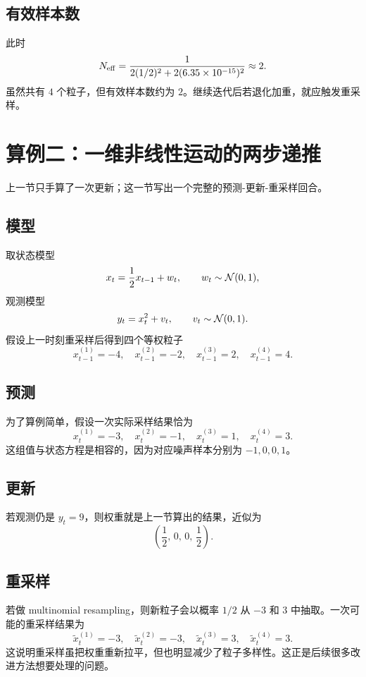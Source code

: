 \documentclass[12pt,a4paper]{ctexart}
\begin{document}
\subsection{有效样本数}

此时
\[
N_{\mathrm{eff}}
= \frac{1}{2(1/2)^2 + 2(6.35\times 10^{-15})^2}
\approx 2.
\]
虽然共有 \(4\) 个粒子，但有效样本数约为 \(2\)。继续迭代后若退化加重，就应触发重采样。

\section{算例二：一维非线性运动的两步递推}

上一节只手算了一次更新；这一节写出一个完整的预测-更新-重采样回合。

\subsection{模型}

取状态模型
\[
x_t = \frac{1}{2}x_{t-1} + w_t,\qquad w_t \sim \mathcal{N}(0,1),
\]
观测模型
\[
y_t = x_t^2 + v_t,\qquad v_t \sim \mathcal{N}(0,1).
\]
假设上一时刻重采样后得到四个等权粒子
\[
x_{t-1}^{(1)}=-4,\quad x_{t-1}^{(2)}=-2,\quad x_{t-1}^{(3)}=2,\quad x_{t-1}^{(4)}=4.
\]

\subsection{预测}

为了算例简单，假设一次实际采样结果恰为
\[
x_t^{(1)}=-3,\quad x_t^{(2)}=-1,\quad x_t^{(3)}=1,\quad x_t^{(4)}=3.
\]
这组值与状态方程是相容的，因为对应噪声样本分别为 \(-1,0,0,1\)。

\subsection{更新}

若观测仍是 \(y_t=9\)，则权重就是上一节算出的结果，近似为
\[
\left(\frac{1}{2},\,0,\,0,\,\frac{1}{2}\right).
\]

\subsection{重采样}

若做 multinomial resampling，则新粒子会以概率 \(1/2\) 从 \(-3\) 和 \(3\) 中抽取。一次可能的重采样结果为
\[
\tilde{x}_t^{(1)}=-3,\quad
\tilde{x}_t^{(2)}=-3,\quad
\tilde{x}_t^{(3)}=3,\quad
\tilde{x}_t^{(4)}=3.
\]
这说明重采样虽把权重重新拉平，但也明显减少了粒子多样性。这正是后续很多改进方法想要处理的问题。
\end{document}
